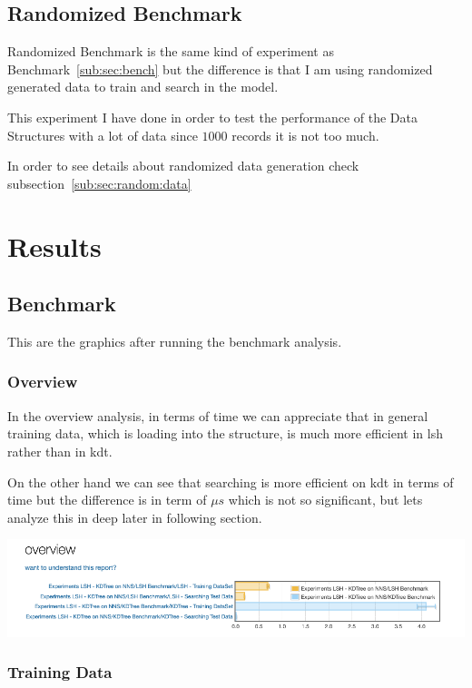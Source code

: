 \documentclass[12pt, a4paper]{article}
\begin{document}
\subsection{Randomized Benchmark}\label{sub:sec:exp:random}
Randomized Benchmark is the same kind of experiment as Benchmark~\ref{sub:sec:bench} but the difference is that I am using randomized generated data to train and search in the model.

This experiment I have done in order to test the performance of the Data Structures with a lot of data since $1000$ records it is not too much.

In order to see details about randomized data generation check subsection~\ref{sub:sec:random:data}

\section{Results}
\subsection{Benchmark}
This are the graphics after running the benchmark analysis.

\subsubsection{Overview}
In the overview analysis, in terms of time we can appreciate that in general training data, which is loading into the structure, is much more efficient in \acrshort{lsh} rather than in \acrshort{kdt}.

On the other hand we can see that searching is more efficient on \acrshort{kdt} in terms of time but the difference is in term of $\mu s$ which is not so significant, but lets analyze this in deep later in following section.

\begin{minipage}[t]{\linewidth}
  \includegraphics[width=\textwidth]{bench_overview}
  \captionsetup{type=figure}
  \label{fig:bench_overview}
\end{minipage}


\subsubsection{Training Data}
\end{document}
